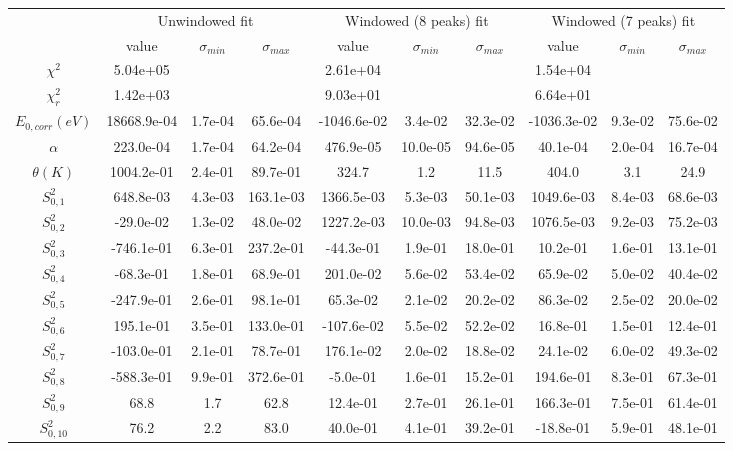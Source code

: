 \documentclass{article}
\begin{document}
\begin{landscape}
\begin{table}[ht]
\centering
\begin{tabular}{c|c|c|c|c|c|c|c|c|c}
\hline
&\multicolumn{3}{|c}{Unwindowed fit}&\multicolumn{3}{|c}{Windowed (8 peaks) fit}&\multicolumn{3}{|c}{Windowed (7 peaks) fit}\\
& value & $\sigma_{min}$ & $\sigma_{max}$& value & $\sigma_{min}$ & $\sigma_{max}$& value & $\sigma_{min}$ & $\sigma_{max}$\\
\hline
$\chi^2$   & 5.04e+05 & & & 2.61e+04 & & & 1.54e+04 & & \\
$\chi^2_r$ & 1.42e+03 & & & 9.03e+01 & & & 6.64e+01 & & \\
\hline
$E_{0,corr} (eV)$& 18668.9e-04 & 1.7e-04 & 65.6e-04 & -1046.6e-02 & 3.4e-02 & 32.3e-02 & -1036.3e-02 & 9.3e-02 & 75.6e-02 \\
$\alpha $       & 223.0e-04 & 1.7e-04 & 64.2e-04 & 476.9e-05 & 10.0e-05 & 94.6e-05 & 40.1e-04 & 2.0e-04 & 16.7e-04 \\
$\theta (K) $   & 1004.2e-01 & 2.4e-01 & 89.7e-01 & 324.7 & 1.2 & 11.5 & 404.0 & 3.1 & 24.9 \\
$S^2_{0,1}$& 648.8e-03 & 4.3e-03 & 163.1e-03 & 1366.5e-03 & 5.3e-03 & 50.1e-03 & 1049.6e-03 & 8.4e-03 & 68.6e-03 \\
$S^2_{0,2}$& -29.0e-02 & 1.3e-02 & 48.0e-02 & 1227.2e-03 & 10.0e-03 & 94.8e-03 & 1076.5e-03 & 9.2e-03 & 75.2e-03 \\
$S^2_{0,3}$& -746.1e-01 & 6.3e-01 & 237.2e-01 & -44.3e-01 & 1.9e-01 & 18.0e-01 & 10.2e-01 & 1.6e-01 & 13.1e-01 \\
$S^2_{0,4}$& -68.3e-01 & 1.8e-01 & 68.9e-01 & 201.0e-02 & 5.6e-02 & 53.4e-02 & 65.9e-02 & 5.0e-02 & 40.4e-02 \\
$S^2_{0,5}$& -247.9e-01 & 2.6e-01 & 98.1e-01 & 65.3e-02 & 2.1e-02 & 20.2e-02 & 86.3e-02 & 2.5e-02 & 20.0e-02 \\
$S^2_{0,6}$& 195.1e-01 & 3.5e-01 & 133.0e-01 & -107.6e-02 & 5.5e-02 & 52.2e-02 & 16.8e-01 & 1.5e-01 & 12.4e-01 \\
$S^2_{0,7}$& -103.0e-01 & 2.1e-01 & 78.7e-01 & 176.1e-02 & 2.0e-02 & 18.8e-02 & 24.1e-02 & 6.0e-02 & 49.3e-02 \\
$S^2_{0,8}$& -588.3e-01 & 9.9e-01 & 372.6e-01 & -5.0e-01 & 1.6e-01 & 15.2e-01 & 194.6e-01 & 8.3e-01 & 67.3e-01 \\
$S^2_{0,9}$& 68.8 & 1.7 & 62.8 & 12.4e-01 & 2.7e-01 & 26.1e-01 & 166.3e-01 & 7.5e-01 & 61.4e-01 \\
$S^2_{0,10}$& 76.2 & 2.2 & 83.0 & 40.0e-01 & 4.1e-01 & 39.2e-01 & -18.8e-01 & 5.9e-01 & 48.1e-01 \\

\end{tabular}
\end{table}
\end{landscape}
\end{document}

